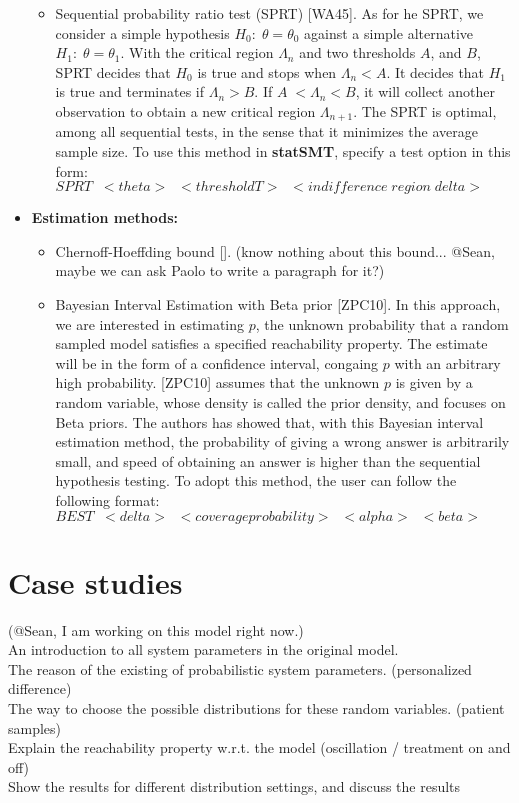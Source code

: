 \documentclass[runningheads,a4paper]{llncs}
\begin{document}
\begin{itemize}
\begin{itemize}
\item Sequential probability ratio test (SPRT) [WA45]. As for he SPRT, we consider a simple hypothesis $H_0:\;\theta = \theta_0$ against a simple alternative $H_1:\;\theta = \theta_1$. With the critical region $\Lambda_n$ and two thresholds $A$, and $B$, SPRT decides that $H_0$ is true and stops when $\Lambda_n < A$. It decides that $H_1$ is true and terminates if $\Lambda_n > B$. If $A\; < \Lambda_n < B$, it will collect another observation to obtain a new critical region $\Lambda_{n+1}$. The SPRT is optimal, among all sequential tests, in the sense that it minimizes the average sample size. To use this method in {\bf statSMT}, specify a test option in this form:\\ $SPRT\;\; <theta> \;\;<threshold T>\;\; <indifference\; region\; delta>$\\
\end{itemize}

\item {\bf Estimation methods:}\\
\begin{itemize}
\item Chernoff-Hoeffding bound []. (know nothing about this bound... @Sean, maybe we can ask Paolo to write a paragraph for it?)
\item Bayesian Interval Estimation with Beta prior [ZPC10]. In this approach, we are interested in estimating $p$, the unknown probability that a random sampled model satisfies a specified reachability property. The estimate will be in the form of a confidence interval, congaing $p$ with an arbitrary high probability. [ZPC10] assumes that the unknown $p$ is given by a random variable, whose density is called the prior density, and focuses on Beta priors. The authors has showed that, with this Bayesian interval estimation method, the probability of giving a wrong answer is arbitrarily small, and speed of obtaining an answer is higher than the sequential hypothesis testing. To adopt this method, the user can follow the following format:\\
$BEST\;\; <delta> \;\;<coverage probability>\;\; <alpha> \;\;<beta>$\\
\end{itemize}
\end{itemize}


\section{Case studies}
(@Sean, I am working on this model right now.)\\
An introduction to all system parameters in the original model.\\
The reason of the existing of probabilistic system parameters. (personalized difference)\\
The way to choose the possible distributions for these random variables. (patient samples)\\
Explain the reachability property w.r.t. the model (oscillation / treatment on and off)\\
Show the results for different distribution settings, and discuss the results \\
\end{document}
